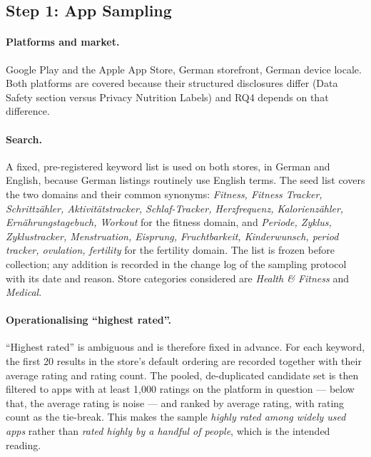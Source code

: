 \subsection{Step 1: App Sampling}
\label{sec:sampling}

\paragraph{Platforms and market.}
Google Play and the Apple App Store, German storefront, German device locale.
Both platforms are covered because their structured disclosures differ (Data
Safety section versus Privacy Nutrition Labels) and RQ4 depends on that
difference.

\paragraph{Search.}
A fixed, pre-registered keyword list is used on both stores, in German and
English, because German listings routinely use English terms. The seed list
covers the two domains and their common synonyms: \emph{Fitness, Fitness
Tracker, Schrittz\"ahler, Aktivit\"atstracker, Schlaf-Tracker, Herzfrequenz,
Kalorienz\"ahler, Ern\"ahrungstagebuch, Workout} for the fitness domain, and
\emph{Periode, Zyklus, Zyklustracker, Menstruation, Eisprung, Fruchtbarkeit,
Kinderwunsch, period tracker, ovulation, fertility} for the fertility domain.
The list is frozen before collection; any addition is recorded in the change log
of the sampling protocol with its date and reason. Store categories considered
are \emph{Health \& Fitness} and \emph{Medical}.

\paragraph{Operationalising \enquote{highest rated}.}
\enquote{Highest rated} is ambiguous and is therefore fixed in advance. For each
keyword, the first 20 results in the store's default ordering are recorded
together with their average rating and rating count. The pooled, de-duplicated
candidate set is then filtered to apps with at least 1{,}000 ratings on the
platform in question --- below that, the average rating is noise --- and ranked
by average rating, with rating count as the tie-break. This makes the sample
\emph{highly rated among widely used apps} rather than \emph{rated highly by a
handful of people}, which is the intended reading.

